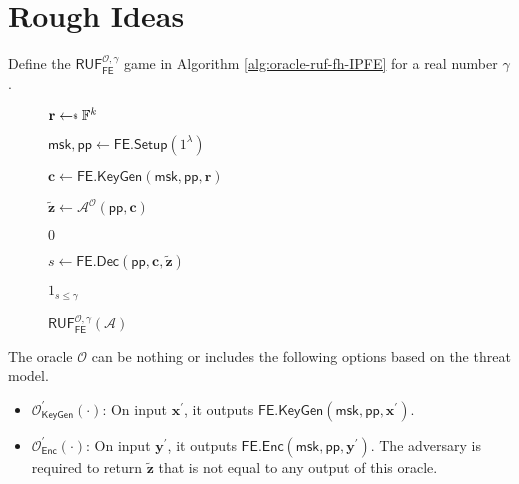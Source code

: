 
\newpage

\section{Rough Ideas}

Define the $\textsf{RUF}^{\mathcal{O}, \gamma}_\textsf{FE}$ game in Algorithm \ref{alg:oracle-ruf-fh-IPFE} for a real number $\gamma$.

\begin{figure}[h]
\centering

	\begin{minipage}[t]{0.55\textwidth}
	\begin{algorithm}[H]
	\caption{$\textsf{RUF}^{\mathcal{O}, \gamma}_{\textsf{FE}}(\mathcal{A})$}
	\label{alg:oracle-ruf-fh-IPFE}
	\begin{algorithmic}[1]
		\State $\mathbf{r} \getsdollar \mathbb{F}^{k}$ \label{alg:oracle-ruf-fh-IPFE:r}

		\State $\textsf{msk}, \textsf{pp} \gets \textsf{FE.Setup}(1^\lambda)$

		\State $\mathbf{c} \gets \textsf{FE.KeyGen}(\textsf{msk}, \textsf{pp}, \mathbf{r})$

		\State $\mathbf{\tilde{z}} \gets \mathcal{A}^{\mathcal{O}} ( \textsf{pp}, \mathbf{c} )$

			
			\State \Return $0$
		
		\EndIf

		\State $s \gets \textsf{FE.Dec}(\textsf{pp}, \mathbf{c}, \mathbf{\tilde{z}} )$

		\State \Return $1_{s \leq \gamma}$
	\end{algorithmic}
	\end{algorithm}
	\end{minipage}

\end{figure}

The oracle $\mathcal{O}$ can be nothing or includes the following options based on the threat model.

\begin{itemize}

	\item $\mathcal{O}^\prime_{\textsf{KeyGen}}(\cdot)$: On input $\mathbf{x}^\prime$, it outputs $\textsf{FE.KeyGen}(\textsf{msk}, \textsf{pp}, \mathbf{x}^\prime)$.
	
	\item $\mathcal{O}^\prime_{\textsf{Enc}}(\cdot)$: On input $\mathbf{y}^\prime$, it outputs $\textsf{FE.Enc}(\textsf{msk}, \textsf{pp}, \mathbf{y}^\prime)$. The adversary is required to return $\mathbf{\tilde{z}}$ that is not equal to any output of this oracle.
\end{itemize}


